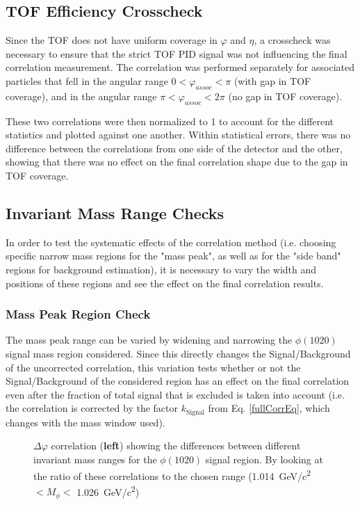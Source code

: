 \documentclass[ALICE,manyauthors]{ALICE_analysis_notes}
\begin{document}
\subsection{TOF Efficiency Crosscheck}

Since the TOF does not have uniform coverage in $\varphi$ and $\eta$, a crosscheck was necessary to ensure that the strict TOF PID signal was not influencing the final correlation measurement.  The correlation was performed separately for associated particles that fell in the angular range $0 < \varphi_{assoc} < \pi$ (with gap in TOF coverage), and in the angular range $\pi < \varphi_{assoc} < 2\pi$ (no gap in TOF coverage).  

These two correlations were then normalized to 1 to account for the different statistics and plotted against one another.  Within statistical errors, there was no difference between the correlations from one side of the detector and the other, showing that there was no effect on the final correlation shape due to the gap in TOF coverage.

\subsection{Invariant Mass Range Checks}
\label{rangeselection}
In order to test the systematic effects of the correlation method (i.e. choosing specific narrow mass regions for the "mass peak", as well as for the "side band" regions for background estimation), it is necessary to vary the width and positions of these regions and see the effect on the final correlation results.

\subsubsection{Mass Peak Region Check} 

The mass peak range can be varied by widening and narrowing the $\phi(1020)$ signal mass region considered. Since this directly changes the Signal/Background of the uncorrected correlation, this variation tests whether or not the Signal/Background of the considered region has an effect on the final correlation even after the fraction of total signal that is excluded is taken into account (i.e. the correlation is corrected by the factor $k_{\text{Signal}}$ from Eq. \ref{fullCorrEq}, which changes with the mass window used).

\begin{figure}[ht]
\centering
\begin{subfigure}{
\texttt{[image: images/masspeakdphi.pdf]}}
\end{subfigure}
\begin{subfigure}{
\texttt{[image: images/masspeakratios.pdf]}}
\end{subfigure}
\caption{$\Delta\varphi$ correlation (\textbf{left}) showing the differences between different invariant mass ranges for the $\phi(1020)$ signal region.  By looking at the ratio of these correlations to the chosen range (\SI{1.014}{GeV/c^2}$ < M_{\phi} <$ \SI{1.026}{GeV/c^2})}
\label{masspeakcheck}
\end{figure}
\end{document}
